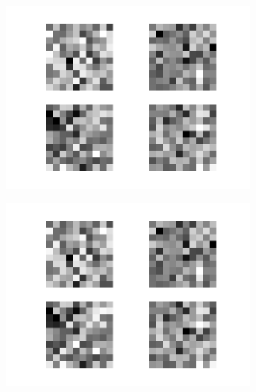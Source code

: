 \begin{figure}[h!]
\begin{subfigure}[t]{.19\textwidth}
  		\includegraphics[width=\linewidth]{imgs/inspect/00012.png}
  		\label{fig:sub1}
	\end{subfigure}%
	\begin{subfigure}[t]{.19\textwidth}
  		\centering
  		\includegraphics[width=\linewidth]{imgs/inspect/00013.png}
  		\label{fig:sub1}
	\end{subfigure}%
	\begin{subfigure}[t]{.19\textwidth}
  		\centering

\end{subfigure}
\end{figure}
